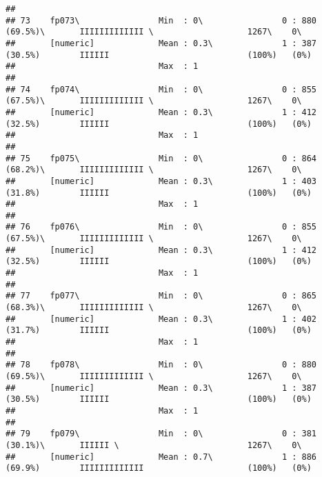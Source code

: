 \documentclass[]{article}
\begin{document}
\begin{verbatim}
## 
## 73    fp073\                Min  : 0\                0 : 880 (69.5%)\       IIIIIIIIIIIII \                   1267\    0\       
##       [numeric]             Mean : 0.3\              1 : 387 (30.5%)        IIIIII                            (100%)   (0%)     
##                             Max  : 1                                                                                            
## 
## 74    fp074\                Min  : 0\                0 : 855 (67.5%)\       IIIIIIIIIIIII \                   1267\    0\       
##       [numeric]             Mean : 0.3\              1 : 412 (32.5%)        IIIIII                            (100%)   (0%)     
##                             Max  : 1                                                                                            
## 
## 75    fp075\                Min  : 0\                0 : 864 (68.2%)\       IIIIIIIIIIIII \                   1267\    0\       
##       [numeric]             Mean : 0.3\              1 : 403 (31.8%)        IIIIII                            (100%)   (0%)     
##                             Max  : 1                                                                                            
## 
## 76    fp076\                Min  : 0\                0 : 855 (67.5%)\       IIIIIIIIIIIII \                   1267\    0\       
##       [numeric]             Mean : 0.3\              1 : 412 (32.5%)        IIIIII                            (100%)   (0%)     
##                             Max  : 1                                                                                            
## 
## 77    fp077\                Min  : 0\                0 : 865 (68.3%)\       IIIIIIIIIIIII \                   1267\    0\       
##       [numeric]             Mean : 0.3\              1 : 402 (31.7%)        IIIIII                            (100%)   (0%)     
##                             Max  : 1                                                                                            
## 
## 78    fp078\                Min  : 0\                0 : 880 (69.5%)\       IIIIIIIIIIIII \                   1267\    0\       
##       [numeric]             Mean : 0.3\              1 : 387 (30.5%)        IIIIII                            (100%)   (0%)     
##                             Max  : 1                                                                                            
## 
## 79    fp079\                Min  : 0\                0 : 381 (30.1%)\       IIIIII \                          1267\    0\       
##       [numeric]             Mean : 0.7\              1 : 886 (69.9%)        IIIIIIIIIIIII                     (100%)   (0%)     

\end{verbatim}
\end{document}
